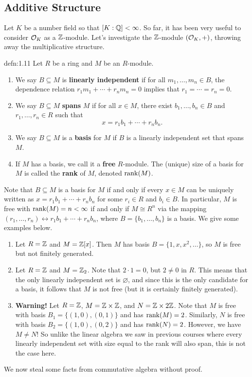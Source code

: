 \subsection{Additive Structure}\label{subsec:1.4}
Let $K$ be a number field so that $[K : \mathbb{Q}] < \infty$. So far, it has been 
very useful to consider ${\cal O}_K$ as a $\mathbb{Z}$-module. Let's investigate the 
$\mathbb{Z}$-module $({\cal O}_K, +)$, throwing away the multiplicative structure. 

\begin{defn}{defn:1.11}
    Let $R$ be a ring and $M$ be an $R$-module.
    \begin{enumerate}[(1)]
        \item We say $B \subseteq M$ is {\bf linearly independent} 
        if for all $m_1, \dots, m_n \in B$, the dependence relation 
        $r_1 m_1 + \cdots + r_n m_n = 0$ implies that $r_1 = \cdots = r_n = 0$.
        \item We say $B \subseteq M$ {\bf spans} $M$ if for all $x \in M$, 
        there exist $b_1, \dots, b_n \in B$ and $r_1, \dots, r_n \in R$ such that 
        \[ x = r_1 b_1 + \cdots + r_n b_n. \] 
        \item We say $B \subseteq M$ is a {\bf basis} for $M$ if $B$ is a 
        linearly independent set that spans $M$. 
        \item If $M$ has a basis, we call it a {\bf free} $R$-module. The 
        (unique) size of a basis for $M$ is called the {\bf rank} of $M$, 
        denoted $\operatorname{rank}(M)$. 
    \end{enumerate}
\end{defn}

Note that $B \subseteq M$ is a basis for $M$ if and only if every $x \in M$ 
can be uniquely written as $x = r_1 b_1 + \cdots + r_n b_n$ for some 
$r_i \in R$ and $b_i \in B$. In particular, $M$ is free with 
$\operatorname{rank}(M) = n < \infty$ if and only if $M \cong R^n$ via the mapping 
$(r_1, \dots, r_n) \leftrightarrow r_1 b_1 + \cdots + r_n b_n$, where 
$B = \{b_1, \dots, b_n\}$ is a basis. We give some examples below.
\begin{enumerate}[(1)]
    \item Let $R = \mathbb{Z}$ and $M = \mathbb{Z}[x]$. Then $M$ has basis $B = 
    \{1, x, x^2, \dots\}$, so $M$ is free but not finitely generated. 
    \item Let $R = \mathbb{Z}$ and $M = \mathbb{Z}_2$. Note that $2 \cdot 1 = 0$, but 
    $2 \neq 0$ in $R$. This means that the only linearly independent 
    set is $\varnothing$, and since this is the only candidate for a 
    basis, it follows that $M$ is not free (but it is certainly 
    finitely generated).
    \item {\bf Warning!} Let $R = \mathbb{Z}$, $M = \mathbb{Z} \times \mathbb{Z}$, and $N = 
    \mathbb{Z} \times 2\mathbb{Z}$. Note that $M$ is free with basis 
    $B_1 = \{(1, 0), (0, 1)\}$ and has $\operatorname{rank}(M) = 2$. Similarly, 
    $N$ is free with basis $B_2 = \{(1, 0), (0, 2)\}$ and has 
    $\operatorname{rank}(N) = 2$. However, we have $M \neq N$! So unlike the linear 
    algebra we saw in previous courses where every linearly independent set 
    with size equal to the rank will also span, this is not the case here. 
\end{enumerate}
We now steal some facts from commutative algebra without proof. 

